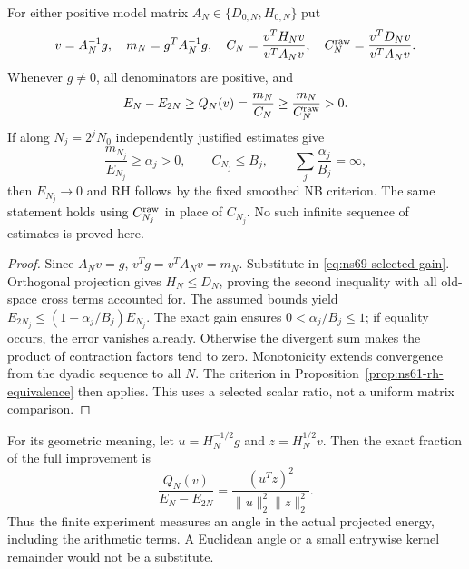 \begin{proposition}
\label{prop:ns71-selected-input}
For either positive model matrix $A_N\in\{D_{0,N},H_{0,N}\}$ put
\[
 v=A_N^{-1}g,\quad m_N=g^TA_N^{-1}g,\quad
 C_N=\frac{v^TH_Nv}{v^TA_Nv},\quad
 C_N^{\rm raw}=\frac{v^TD_Nv}{v^TA_Nv}.
\]
Whenever $g\ne0$, all denominators are positive, and
\begin{equation}
 E_N-E_{2N}\geq Q_N(v)=\frac{m_N}{C_N}
                  \geq\frac{m_N}{C_N^{\rm raw}}>0.
 \label{eq:ns71-selected-ratio}
\end{equation}
If along $N_j=2^jN_0$ independently justified estimates give
\[
 \frac{m_{N_j}}{E_{N_j}}\geq\alpha_j>0,
 \qquad C_{N_j}\leq B_j,
 \qquad \sum_j\frac{\alpha_j}{B_j}=\infty,
\]
then $E_{N_j}\to0$ and RH follows by the fixed smoothed NB criterion.
The same statement holds using $C_{N_j}^{\rm raw}$ in place of $C_{N_j}$.
No such infinite sequence of estimates is proved here.
\end{proposition}
\begin{proof}
Since $A_Nv=g$, $v^Tg=v^TA_Nv=m_N$. Substitute in
\eqref{eq:ns69-selected-gain}. Orthogonal projection gives
$H_N\leq D_N$, proving the second inequality with all old-space
cross terms accounted for. The assumed bounds yield
$E_{2N_j}\leq(1-\alpha_j/B_j)E_{N_j}$.
The exact gain ensures $0<\alpha_j/B_j\leq1$; if equality occurs,
the error vanishes already. Otherwise the divergent sum makes the
product of contraction factors tend to zero. Monotonicity extends
convergence from the dyadic sequence to all $N$. The criterion in
Proposition~\ref{prop:ns61-rh-equivalence} then applies.
This uses a selected scalar ratio, not a uniform matrix comparison.
\end{proof}

For its geometric meaning, let $u=H_N^{-1/2}g$ and
$z=H_N^{1/2}v$. Then the exact fraction of the full improvement is
\[
 \frac{Q_N(v)}{E_N-E_{2N}}=
       \frac{(u^Tz)^2}{\|u\|_2^2\|z\|_2^2}.
\]
Thus the finite experiment measures an angle in the actual projected
energy, including the arithmetic terms. A Euclidean angle or a small
entrywise kernel remainder would not be a substitute.

